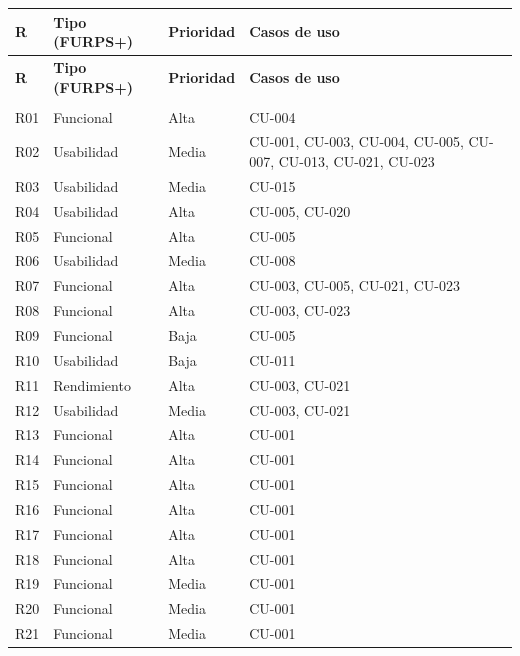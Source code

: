 \documentclass[11pt,a4paper]{article}
\DeclareRobustCommand{\_}{\textunderscore\allowbreak}
\begin{document}
\begin{center}
\small
\begin{longtable}{|>{\raggedright\arraybackslash}p{}|>{\raggedright\arraybackslash}p{}|>{\raggedright\arraybackslash}p{}|>{\raggedright\arraybackslash}p{}|}
\hline
\textbf{R} & \textbf{Tipo (FURPS+)} & \textbf{Prioridad} & \textbf{Casos de uso} \\
\hline
\endfirsthead
\hline
\textbf{R} & \textbf{Tipo (FURPS+)} & \textbf{Prioridad} & \textbf{Casos de uso} \\
\hline
\endhead
\hline
\multicolumn{4}{r}{\textit{Continúa en la siguiente página}} \\
\endfoot
\hline
\endlastfoot

R01 & Funcional & Alta & CU-004 \\
\hline
R02 & Usabilidad & Media & CU-001, CU-003, CU-004, CU-005, CU-007, CU-013, CU-021, CU-023 \\
\hline
R03 & Usabilidad & Media & CU-015 \\
\hline
R04 & Usabilidad & Alta & CU-005, CU-020 \\
\hline
R05 & Funcional & Alta & CU-005 \\
\hline
R06 & Usabilidad & Media & CU-008 \\
\hline
R07 & Funcional & Alta & CU-003, CU-005, CU-021, CU-023 \\
\hline
R08 & Funcional & Alta & CU-003, CU-023 \\
\hline
R09 & Funcional & Baja & CU-005 \\
\hline
R10 & Usabilidad & Baja & CU-011 \\
\hline
R11 & Rendimiento & Alta & CU-003, CU-021 \\
\hline
R12 & Usabilidad & Media & CU-003, CU-021 \\
\hline
R13 & Funcional & Alta & CU-001 \\
\hline
R14 & Funcional & Alta & CU-001 \\
\hline
R15 & Funcional & Alta & CU-001 \\
\hline
R16 & Funcional & Alta & CU-001 \\
\hline
R17 & Funcional & Alta & CU-001 \\
\hline
R18 & Funcional & Alta & CU-001 \\
\hline
R19 & Funcional & Media & CU-001 \\
\hline
R20 & Funcional & Media & CU-001 \\
\hline
R21 & Funcional & Media & CU-001 \\

\end{longtable}
\end{center}
\end{document}
